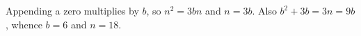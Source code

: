Appending a zero multiplies by $b$, so $n^2=3bn$ and $n=3b$. Also $b^2+3b=3n=9b$, whence $b=6$ and $\boxed{n=18}$.
